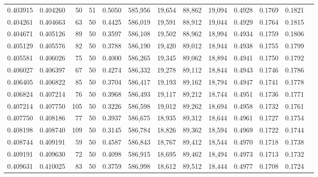 \begin{tabular}{rrrrrrrrrrrrr}
0.403915 & 0.404260 &    50 &  51 &                                     0.5050 & 585,956 &  19,654 &  88,862 &  19,094 & 0.4928 & 0.1769 & 0.1821 \\
0.404261 & 0.404663 &    63 &  50 &                                     0.4425 & 586,019 &  19,591 &  88,912 &  19,044 & 0.4929 & 0.1764 & 0.1815 \\
0.404671 & 0.405126 &    89 &  50 &                                     0.3597 & 586,108 &  19,502 &  88,962 &  18,994 & 0.4934 & 0.1759 & 0.1806 \\
0.405129 & 0.405576 &    82 &  50 &                                     0.3788 & 586,190 &  19,420 &  89,012 &  18,944 & 0.4938 & 0.1755 & 0.1799 \\
0.405581 & 0.406026 &    75 &  50 &                                     0.4000 & 586,265 &  19,345 &  89,062 &  18,894 & 0.4941 & 0.1750 & 0.1792 \\
0.406027 & 0.406397 &    67 &  50 &                                     0.4274 & 586,332 &  19,278 &  89,112 &  18,844 & 0.4943 & 0.1746 & 0.1786 \\
0.406405 & 0.406822 &    85 &  50 &                                     0.3704 & 586,417 &  19,193 &  89,162 &  18,794 & 0.4947 & 0.1741 & 0.1778 \\
0.406824 & 0.407214 &    76 &  50 &                                     0.3968 & 586,493 &  19,117 &  89,212 &  18,744 & 0.4951 & 0.1736 & 0.1771 \\
0.407214 & 0.407750 &   105 &  50 &                                     0.3226 & 586,598 &  19,012 &  89,262 &  18,694 & 0.4958 & 0.1732 & 0.1761 \\
0.407750 & 0.408186 &    77 &  50 &                                     0.3937 & 586,675 &  18,935 &  89,312 &  18,644 & 0.4961 & 0.1727 & 0.1754 \\
0.408198 & 0.408740 &   109 &  50 &                                     0.3145 & 586,784 &  18,826 &  89,362 &  18,594 & 0.4969 & 0.1722 & 0.1744 \\
0.408744 & 0.409191 &    59 &  50 &                                     0.4587 & 586,843 &  18,767 &  89,412 &  18,544 & 0.4970 & 0.1718 & 0.1738 \\
0.409191 & 0.409630 &    72 &  50 &                                     0.4098 & 586,915 &  18,695 &  89,462 &  18,494 & 0.4973 & 0.1713 & 0.1732 \\
0.409631 & 0.410025 &    83 &  50 &                                     0.3759 & 586,998 &  18,612 &  89,512 &  18,444 & 0.4977 & 0.1708 & 0.1724 \\

\end{tabular}
